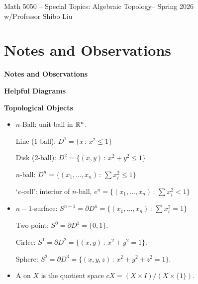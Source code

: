 \documentclass[12pt,a4paper]{report}
\newcommand{\CLASSNAME}{Math 5050 -- Special Topics: Algebraic Topology}
\newcommand{\PROFESSOR}{Professor Shibo Liu}
\newcommand{\SEMESTER}{Spring 2026}
\begin{document}
\begin{center}
	\Large{\CLASSNAME -- \SEMESTER} \\
	\large{ w/\PROFESSOR}
\end{center}

\section*{Notes and Observations}
\begin{center}
 \textbf{\Large{Notes and Observations}}
\end{center}

\HLINE


\begin{description}
	\item \textbf{Helpful Diagrams}
	

	\item \textbf{Topological Objects}
	\begin{itemize}
		\item $n$-Ball: unit ball in $\mathbb{R}^n$.
		
		Line (1-ball): $D^1 = \{x\,:\, x^2 \le 1\}$
		
		Disk (2-ball): $D^2 = \{(x,y)\,:\, x^2+y^2 \le 1\}$
		
		$n$-ball: $D^n= \{(x_1,\dots,x_n)\,:\, \sum x_i^2 \le 1\}$
		
		`$e$-cell': interior of $n$-ball, $e^n = \{(x_1,\dots,x_n)\,:\, \sum x_i^2 < 1\}$
		
		\item $n-1$-surface: $S^{n-1} = \partial D^n =\{(x_1,\dots,x_n)\,:\, \sum x_i^2 = 1\}$

		Two-point: $S^0 = \partial D^1 = \{0,1\}$.
				
		Cirlce: $S^1 = \partial D^2=\{(x,y)\,:\, x^2+y^2 = 1\}$.
		
		Sphere: $S^2 = \partial D^3=\{(x,y,z)\,:\, x^2+y^2+z^2 = 1\}$.
		
		\item A  on $X$ is the quotient space $cX = (X \times I)/(X\times \{1\})$.
		

\end{itemize}
\end{description}
\end{document}
